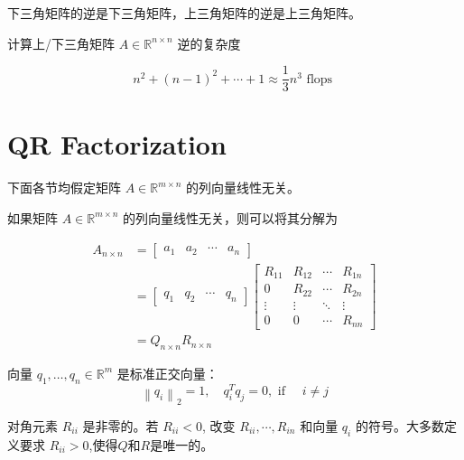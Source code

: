 \begin{theorem}
    下三角矩阵的逆是下三角矩阵，上三角矩阵的逆是上三角矩阵。
\end{theorem}

计算上/下三角矩阵 $  {A} \in \mathbb{R}^{n \times n} $ 逆的复杂度

\begin{equation} n^{2}+(n-1)^{2}+\cdots+1 \approx \frac{1}{3} n^{3}\text{ flops }\end{equation} 

\section{QR Factorization}

\begin{remark}
    下面各节均假定矩阵 $ A \in \mathbb{R}^{m \times n} $ 的列向量线性无关。
\end{remark}

如果矩阵 $ A \in \mathbb{R}^{m \times n} $ 的列向量线性无关，则可以将其分解为

\begin{theorem}[QR Factorization]
    
    \begin{equation}\begin{aligned} A_{n  \times n}&=\left[\begin{array}{llll}a_{1} & a_{2} & \cdots & a_{n}\end{array}\right]\\
        &=\left[\begin{array}{llll}q_{1} & q_{2} & \cdots & q_{n}\end{array}\right]\left[\begin{array}{cccc}R_{11} & R_{12} & \cdots & R_{1 n} \\ 0 & R_{22} & \cdots & R_{2 n} \\ \vdots & \vdots & \ddots & \vdots \\ 0 & 0 & \cdots & R_{n n}\end{array}\right]\\
        &=Q_{n  \times n}R_{n  \times  n}
        \end{aligned}\end{equation}

向量 $ q_{1}, \ldots, q_{n} \in \mathbb{R}^{m} $ 是标准正交向量：
\begin{equation}
\left\|q_{i}\right\|_{2}=1, \quad q_{i}^{T} q_{j}=0, \text { if } \quad i \neq j
\end{equation}

对角元素 $ R_{i i} $ 是非零的。若 $ R_{i i}<0 $, 改变 $ R_{i i}, \cdots, R_{i n} $ 和向量 $ q_{i} $ 的符号。大多数定义要求 $ R_{i i}>0 $,使得$Q$和$R$是唯一的。
\end{theorem}



